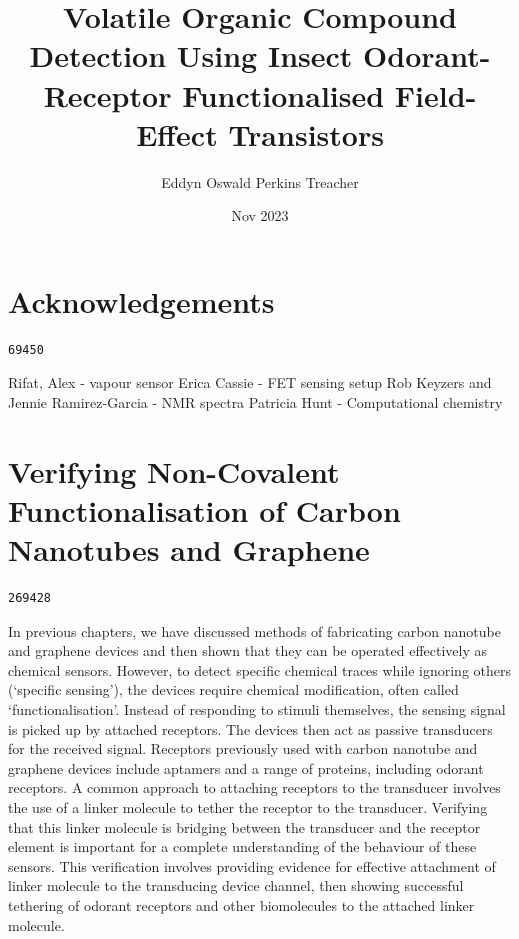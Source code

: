 \documentclass[
  a4paper,
]{scrbook}
\title{Volatile Organic Compound Detection Using Insect Odorant-Receptor
Functionalised Field-Effect Transistors}
\author{Eddyn Oswald Perkins Treacher}
\date{Nov 2023}
\begin{document}
\frontmatter
\maketitle
\ifdefined\Shaded\renewenvironment{Shaded}{\begin{tcolorbox}[breakable, frame hidden, interior hidden, enhanced, borderline west={3pt}{0pt}{shadecolor}, boxrule=0pt, sharp corners]}{\end{tcolorbox}}\fi

\mainmatter
{}

\hypertarget{acknowledgements}{%
\chapter*{Acknowledgements}\label{acknowledgements}}


\begin{verbatim}
69450
\end{verbatim}

Rifat, Alex - vapour sensor Erica Cassie - FET sensing setup Rob Keyzers
and Jennie Ramirez-Garcia - NMR spectra Patricia Hunt - Computational
chemistry


\hypertarget{verifying-non-covalent-functionalisation-of-carbon-nanotubes-and-graphene}{%
\chapter{Verifying Non-Covalent Functionalisation of Carbon Nanotubes
and
Graphene}\label{verifying-non-covalent-functionalisation-of-carbon-nanotubes-and-graphene}}

\begin{verbatim}
269428
\end{verbatim}

In previous chapters, we have discussed methods of fabricating carbon
nanotube and graphene devices and then shown that they can be operated
effectively as chemical sensors. However, to detect specific chemical
traces while ignoring others (`specific sensing'), the devices require
chemical modification, often called `functionalisation'. Instead of
responding to stimuli themselves, the sensing signal is picked up by
attached receptors. The devices then act as passive transducers for the
received signal. Receptors previously used with carbon nanotube and
graphene devices include aptamers and a range of proteins, including
odorant receptors. A common approach to attaching receptors to the
transducer involves the use of a linker molecule to tether the receptor
to the transducer. Verifying that this linker molecule is bridging
between the transducer and the receptor element is important for a
complete understanding of the behaviour of these sensors. This
verification involves providing evidence for effective attachment of
linker molecule to the transducing device channel, then showing
successful tethering of odorant receptors and other biomolecules to the
attached linker molecule.
\end{document}
